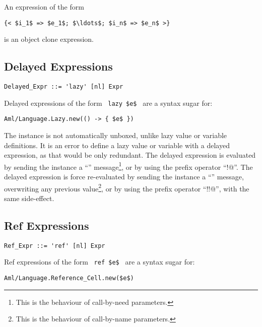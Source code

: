 An expression of the form
\begin{lstlisting}
{< $i_1$ => $e_1$; $\ldots$; $i_n$ => $e_n$ >}
\end{lstlisting}
is an object clone expression. 





\subsection{Delayed Expressions}
\label{sec:delayed-expressions}

\syntax\begin{lstlisting}
Delayed_Expr ::= 'lazy' [nl] Expr
\end{lstlisting}

Delayed expressions of the form ~\lstinline!lazy $e$!~ are a syntax sugar for:
\begin{lstlisting}[deletekeywords={new}]
Aml/Language.Lazy.new(() -> { $e$ })
\end{lstlisting}

The  instance is not automatically unboxed, unlike lazy value or variable definitions. It is an error to define a lazy value or variable with a delayed expression, as that would be only redundant. The delayed expression is evaluated by sending the instance a ``'' message\footnote{This is the behaviour of call-by-need parameters.}, or by using the prefix operator ``\lstinline@!@''. The delayed expression is force re-evaluated by sending the instance a ``'' message, overwriting any previous value\footnote{This is the behaviour of call-by-name parameters.}, or by using the prefix operator ``\lstinline@!!@'', with the same side-effect. 






\subsection{Ref Expressions}
\label{sec:ref-expressions}

\syntax\begin{lstlisting}
Ref_Expr ::= 'ref' [nl] Expr
\end{lstlisting}

Ref expressions of the form ~\lstinline!ref $e$!~ are a syntax sugar for:
\begin{lstlisting}[deletekeywords={new}]
Aml/Language.Reference_Cell.new($e$)
\end{lstlisting}

